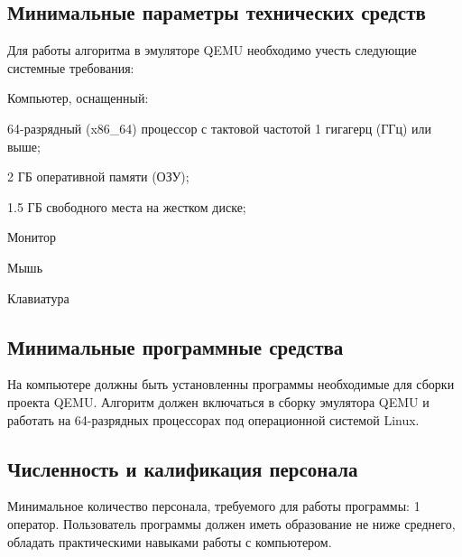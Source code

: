 \subsection{Минимальные параметры технических средств}
Для работы алгоритма в эмуляторе QEMU необходимо учесть следующие системные требования:
\begin{my_enumerate}
\item Компьютер, оснащенный:
    \begin{my_enumerate}
    \item 64-разрядный (x86\_64) процессор с тактовой частотой 1 гигагерц (ГГц) или выше;
    \item 2 ГБ оперативной памяти (ОЗУ);
    \item 1.5 ГБ свободного места на жестком диске;
    \end{my_enumerate}
\item Монитор
\item Мышь
\item Клавиатура
\end{my_enumerate}


\subsection{Минимальные программные средства}
На компьютере должны быть установленны программы необходимые для сборки проекта QEMU. Алгоритм должен включаться в сборку эмулятора QEMU и работать на 64-разрядных процессорах под операционной системой Linux.


\subsection{Численность и калификация персонала}
Минимальное количество персонала, требуемого для работы программы: 1 оператор. Пользователь программы должен иметь образование не ниже среднего, обладать практическими навыками работы с компьютером.